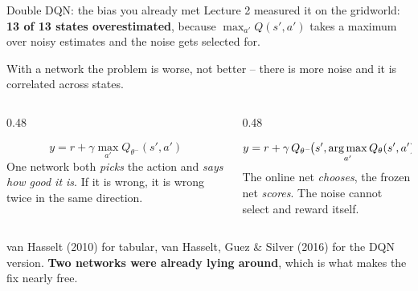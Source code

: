 \documentclass[aspectratio=169]{beamer}
\begin{document}
\begin{frame}{Double DQN: the bias you already met}
  \small
  Lecture 2 measured it on the gridworld: \textbf{13 of 13 states overestimated}, because
  $\max_{a'} Q(s',a')$ takes a maximum over noisy estimates and the noise gets selected for.

  \vskip 6pt
  With a network the problem is worse, not better -- there is more noise and it is correlated
  across states.

  \vskip 8pt
  \begin{columns}[T]
    \begin{column}{0.48\textwidth}
      \begin{tcolorbox}[colback=armred!8, colframe=armred, boxrule=0.6pt, arc=2pt,
                        title={\textbf{DQN}}]
        \small
        \[ y = r + \gamma \max_{a'} Q_{\theta^-}(s',a') \]
        \vskip 2pt
        One network both \emph{picks} the action and \emph{says how good it is}. If it is
        wrong, it is wrong twice in the same direction.
      \end{tcolorbox}
    \end{column}
    \begin{column}{0.48\textwidth}
      \begin{tcolorbox}[colback=paramgreen!8, colframe=paramgreen, boxrule=0.6pt, arc=2pt,
                        title={\textbf{Double DQN}}]
        \small
        \[ y = r + \gamma\, Q_{\theta^-}\!\big(s', \mathop{\mathrm{arg\,max}}_{a'} Q_{\theta}(s',a')\big) \]
        \vskip 2pt
        The online net \emph{chooses}, the frozen net \emph{scores}. The noise cannot select and
        reward itself.
      \end{tcolorbox}
    \end{column}
  \end{columns}

  \vskip 8pt
  \begin{center}
    \small
    van Hasselt (2010) for tabular, van Hasselt, Guez \& Silver (2016) for the DQN version.
    \textbf{Two networks were already lying around}, which is what makes the fix nearly free.
  \end{center}
\end{frame}
\end{document}
